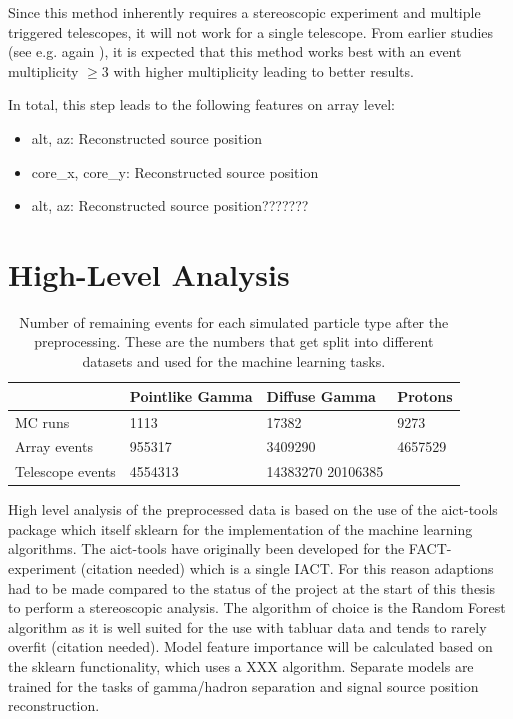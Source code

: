 Since this method inherently requires a stereoscopic experiment
and multiple triggered telescopes, it will not work for a single telescope.
From earlier studies (see e.g. again \cite{kai_diss}), it is expected
that this method works best with an event multiplicity 
$\geq 3$ with higher multiplicity leading to better results.

In total, this step leads to the following features on array level:
\begin{itemize}
    \item{alt, az: Reconstructed source position}
    \item{core\_x, core\_y: Reconstructed source position}
    \item{alt, az: Reconstructed source position???????}
\end{itemize}

\section{High-Level Analysis}

\begin{table}
    \begin{center}
        \begin{tabular}{| l | l | l | l |}
            \hline
            & Pointlike Gamma & Diffuse Gamma & Protons \\
            \hline
            MC runs & \num{1113} & \num{17382} &  \num{9273} \\ 
            \hline
            Array events & \num{955317} & \num{3409290} & \num{4657529} \\
            \hline
            Telescope events & \num{4554313} & \num{14383270} \num{20106385} & 
        \end{tabular}
    \end{center}
    \caption{Number of remaining events for each simulated particle type after the
    preprocessing. These are the numbers that get split into different datasets 
    and used for the machine learning tasks.}
    \label{tab:events_after_prep}
\end{table}

High level analysis of the preprocessed data is based on the use of
the aict-tools \cite{aict-tools} package which itself 
sklearn \cite{sklearn_api} for the implementation of the machine learning algorithms.
The aict-tools have originally been developed for the FACT-experiment
(citation needed) which is a single IACT. For this reason
adaptions had to be made compared to the status of the project at the start 
of this thesis to perform a stereoscopic analysis.
The algorithm of choice is the Random Forest algorithm
as it is well suited for the use with tabluar data and tends to rarely overfit
(citation needed).
Model feature importance will be calculated
based on the sklearn functionality, which
uses a XXX algorithm.
Separate models are trained for the tasks of gamma/hadron
separation and signal source position
reconstruction.


